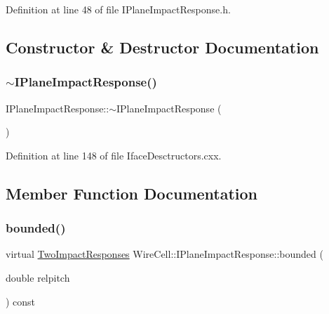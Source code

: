 Definition at line 48 of file I\+Plane\+Impact\+Response.\+h.



\subsection{Constructor \& Destructor Documentation}
\mbox{\label{class_wire_cell_1_1_i_plane_impact_response_a489d57bcf7d07153dcca928ebded32e6}} 
\subsubsection{\texorpdfstring{$\sim$\+I\+Plane\+Impact\+Response()}{~IPlaneImpactResponse()}}
{\footnotesize\ttfamily I\+Plane\+Impact\+Response\+::$\sim$\+I\+Plane\+Impact\+Response (\begin{DoxyParamCaption}{ }\end{DoxyParamCaption})\hspace{0.3cm}{\ttfamily [virtual]}}



Definition at line 148 of file Iface\+Desctructors.\+cxx.



\subsection{Member Function Documentation}
\mbox{\label{class_wire_cell_1_1_i_plane_impact_response_af336a51ac8ccc5df822e10fe1d8275d3}} 
\subsubsection{\texorpdfstring{bounded()}{bounded()}}
{\footnotesize\ttfamily virtual \hyperlink{namespace_wire_cell_ae163f7e69ff1625cf269418b35194d37}{Two\+Impact\+Responses} Wire\+Cell\+::\+I\+Plane\+Impact\+Response\+::bounded (\begin{DoxyParamCaption}\item[{double}]{relpitch }\end{DoxyParamCaption}) const\hspace{0.3cm}{\ttfamily [pure virtual]}}

